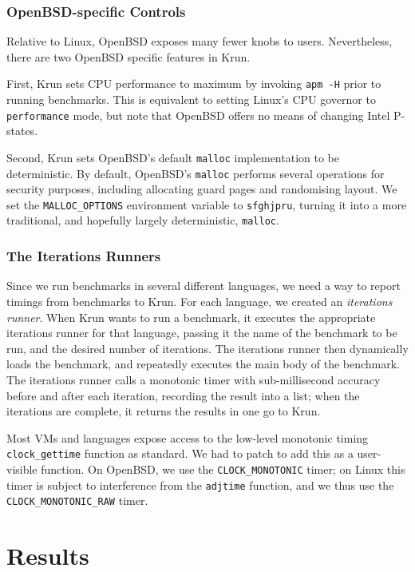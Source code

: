 \documentclass[10pt,preprint]{sigplanconf}
\newcommand{\krun}{Krun\xspace}
\begin{document}
\subsubsection{OpenBSD-specific Controls}

Relative to Linux, OpenBSD exposes many fewer knobs to users. Nevertheless,
there are two OpenBSD specific features in \krun.

First, \krun sets CPU performance to maximum by invoking \texttt{apm -H} prior
to running benchmarks. This is equivalent to setting Linux's CPU governor to
\texttt{performance} mode, but note that OpenBSD offers no means of changing
Intel P-states.

Second, \krun sets OpenBSD's default \texttt{malloc} implementation to be
deterministic. By default, OpenBSD's \texttt{malloc} performs several operations
for security purposes, including allocating guard pages and randomising layout.
We set the \texttt{MALLOC\_OPTIONS} environment variable to \texttt{sfghjpru},
turning it into a more traditional, and hopefully largely deterministic,
\texttt{malloc}.


\subsubsection{The Iterations Runners}

Since we run benchmarks in several different languages, we need a way to report
timings from benchmarks to \krun. For each language, we created an
\emph{iterations runner}. When \krun wants to run a benchmark, it executes the
appropriate iterations runner for that language, passing it the name of the
benchmark to be run, and the desired number of iterations. The iterations runner
then dynamically loads the benchmark, and repeatedly executes the main body of
the benchmark. The iterations runner calls a monotonic timer with
sub-millisecond accuracy before and after each iteration, recording the result
into a list; when the iterations are complete, it returns the results in one go
to \krun.

Most VMs and languages expose access to the low-level monotonic timing
\texttt{clock\_gettime} function as standard. We had to patch  to add this as a user-visible function. On OpenBSD, we use
the \texttt{CLOCK\_MONOTONIC} timer; on Linux this timer is subject to
interference from the \texttt{adjtime} function, and we thus use the
\texttt{CLOCK\_MONOTONIC\_RAW} timer.


\section{Results}
\label{sec:Results}
\end{document}
